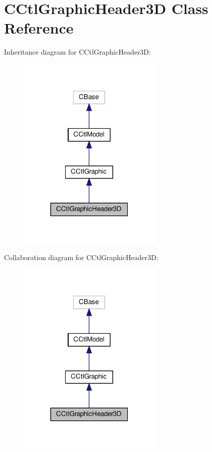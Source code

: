 \hypertarget{classCCtlGraphicHeader3D}{}\section{C\+Ctl\+Graphic\+Header3D Class Reference}
\label{classCCtlGraphicHeader3D}


Inheritance diagram for C\+Ctl\+Graphic\+Header3D\+:
\nopagebreak
\begin{figure}[H]
\begin{center}
\leavevmode
\includegraphics[width=195pt]{classCCtlGraphicHeader3D__inherit__graph}
\end{center}
\end{figure}


Collaboration diagram for C\+Ctl\+Graphic\+Header3D\+:
\nopagebreak
\begin{figure}[H]
\begin{center}
\leavevmode
\includegraphics[width=195pt]{classCCtlGraphicHeader3D__coll__graph}
\end{center}
\end{figure}
